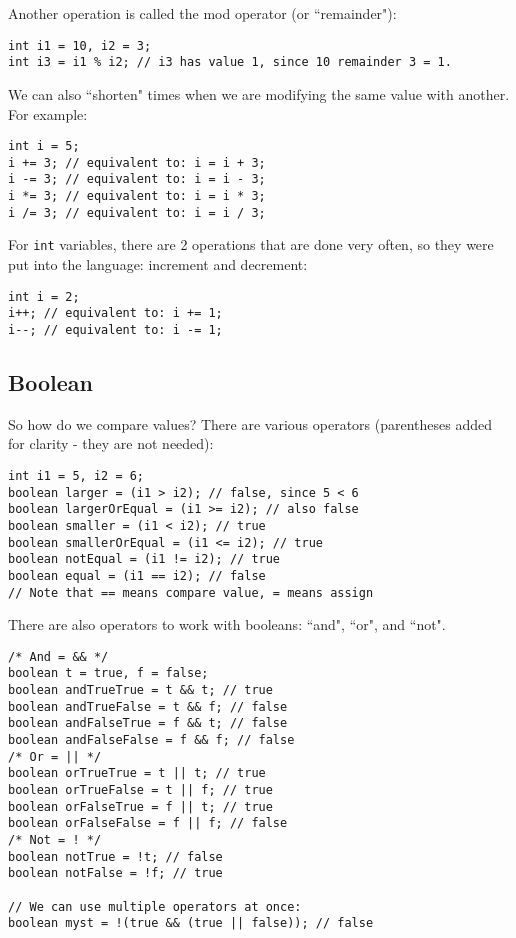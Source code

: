 \noindent Another operation is called the mod operator (or ``remainder"):
\begin{lstlisting}
int i1 = 10, i2 = 3;
int i3 = i1 % i2; // i3 has value 1, since 10 remainder 3 = 1.
\end{lstlisting}

\noindent We can also ``shorten" times when we are modifying the same value with another. For example:
\begin{lstlisting}
int i = 5;
i += 3; // equivalent to: i = i + 3;
i -= 3; // equivalent to: i = i - 3;
i *= 3; // equivalent to: i = i * 3;
i /= 3; // equivalent to: i = i / 3;
\end{lstlisting}

\noindent For \verb|int| variables, there are 2 operations that are done very often, so they were put into the language: increment and decrement:
\begin{lstlisting}
int i = 2;
i++; // equivalent to: i += 1;
i--; // equivalent to: i -= 1;
\end{lstlisting}

\subsection{Boolean}

\noindent So how do we compare values? There are various operators (parentheses added for clarity - they are not needed):
\begin{lstlisting}
int i1 = 5, i2 = 6;
boolean larger = (i1 > i2); // false, since 5 < 6
boolean largerOrEqual = (i1 >= i2); // also false
boolean smaller = (i1 < i2); // true
boolean smallerOrEqual = (i1 <= i2); // true
boolean notEqual = (i1 != i2); // true
boolean equal = (i1 == i2); // false
// Note that == means compare value, = means assign
\end{lstlisting}

\noindent There are also operators to work with booleans: ``and", ``or", and ``not".
\begin{lstlisting}
/* And = && */
boolean t = true, f = false;
boolean andTrueTrue = t && t; // true
boolean andTrueFalse = t && f; // false
boolean andFalseTrue = f && t; // false
boolean andFalseFalse = f && f; // false
/* Or = || */
boolean orTrueTrue = t || t; // true
boolean orTrueFalse = t || f; // true
boolean orFalseTrue = f || t; // true
boolean orFalseFalse = f || f; // false
/* Not = ! */
boolean notTrue = !t; // false
boolean notFalse = !f; // true

// We can use multiple operators at once:
boolean myst = !(true && (true || false)); // false
\end{lstlisting}

